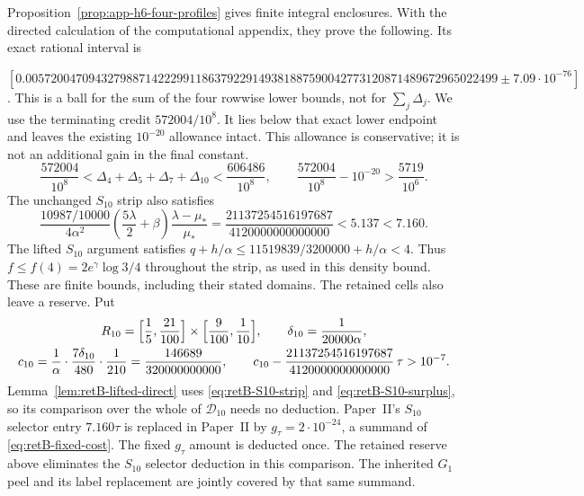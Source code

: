 Proposition~\ref{prop:app-h6-four-profiles} gives finite integral
enclosures. With the directed calculation of the computational appendix,
they prove the following. Its exact rational interval is
\par\noindent
$[0.005720047094327988714222991186379229149381887590042773120871489672965022499
\mathbin{\pm}7.09\cdot10^{-76}]$.
This is a ball for the sum of the four rowwise lower bounds, not for
$\sum_j\Delta_j$.
We use the terminating credit $572004/10^8$. It lies below
that exact lower endpoint and leaves the existing $10^{-20}$ allowance intact.
This allowance is conservative; it is not an additional gain in the final constant.
\begin{equation}\label{eq:retB-H6-finite}
 \frac{572004}{10^8}
 <\Delta_4+\Delta_5+\Delta_7+\Delta_{10}
 <\frac{606486}{10^8},\qquad
 \frac{572004}{10^8}-10^{-20}>\frac{5719}{10^6}.
\end{equation}
The unchanged $S_{10}$ strip also satisfies
\begin{equation}\label{eq:retB-S10-strip}
 \frac{10987/10000}{4\alpha^2}
 \left(\frac{5\lambda}{2}+\beta\right)
 \frac{\lambda-\mu_*}{\mu_*}
 =\frac{21137254516197687}{4120000000000000}
 <5.137<7.160.
\end{equation}
The lifted $S_{10}$ argument satisfies
$q+h/\alpha\le11519839/3200000+h/\alpha<4$.
Thus $f\le f(4)=2e^\gamma\log3/4$ throughout the strip,
as used in this density bound.
These are finite bounds, including their stated domains.
The retained cells also leave a reserve. Put
\begin{equation}\label{eq:retB-S10-surplus}
\begin{gathered}
 R_{10}=\Bigl[\frac15,\frac{21}{100}\Bigr]\times\Bigl[\frac9{100},\frac1{10}\Bigr],
 \qquad \delta_{10}=\frac1{20000\alpha},\\
 c_{10}=\frac1\alpha\cdot\frac{7\delta_{10}}{480}\cdot\frac1{210}
 =\frac{146689}{320000000000},\qquad
 c_{10}-\frac{21137254516197687}{4120000000000000}\,\tau>10^{-7}.
\end{gathered}
\end{equation}
Lemma~\ref{lem:retB-lifted-direct} uses \eqref{eq:retB-S10-strip} and
\eqref{eq:retB-S10-surplus}, so its comparison over the whole of
$\mathcal D_{10}$ needs no deduction. Paper~II's $S_{10}$ selector entry
$7.160\tau$ is replaced in Paper~II by $g_\tau=2\cdot10^{-24}$, a summand of
\eqref{eq:retB-fixed-cost}. The fixed $g_\tau$ amount is deducted once.
The retained reserve above eliminates the $S_{10}$ selector deduction in
this comparison. The inherited $G_1$ peel and its label replacement are
jointly covered by that same summand.

